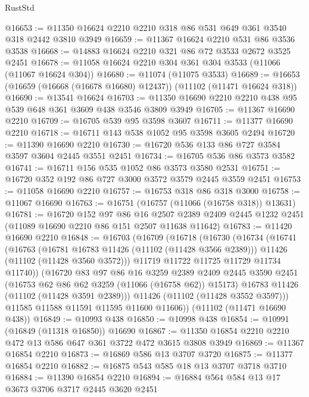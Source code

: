 \begin{lexlean}{RustStd}
\begin{coremodule}
@16653 := @11350 @16624 @2210 @2210 @318 @86 @531 @649 @361 @3540 @318 @2442 @3810 @3949
@16659 := @11367 @16624 @2210 @531 @86 @3536 @3538
@16668 := @14883 @16624 @2210 @321 @86 @72 @3533 @2672 @3525 @2451
@16678 := @11058 @16624 @2210 @304 @361 @304 @3533 (@11066 (@11067 @16624 @304))
@16680 := @11074 (@11075 @3533)
@16689 := @16653 (@16659 (@16668 (@16678 @16680) @12437)) (@11102 (@11471 @16624 @318))
@16690 := @13541 @16624
@16703 := @11350 @16690 @2210 @2210 @438 @95 @539 @648 @361 @3609 @438 @3546 @3809 @3949
@16705 := @11367 @16690 @2210
@16709 := @16705 @539 @95 @3598 @3607
@16711 := @11377 @16690 @2210
@16718 := @16711 @143 @538 @1052 @95 @3598 @3605 @2494
@16720 := @11390 @16690 @2210
@16730 := @16720 @536 @133 @86 @727 @3584 @3597 @3604 @2445 @3551 @2451
@16734 := @16705 @536 @86 @3573 @3582
@16741 := @16711 @156 @535 @1052 @86 @3573 @3580 @2531
@16751 := @16720 @352 @192 @86 @727 @3000 @3572 @3579 @2445 @3559 @2451
@16753 := @11058 @16690 @2210
@16757 := @16753 @318 @86 @318 @3000
@16758 := @11067 @16690
@16763 := @16751 (@16757 (@11066 (@16758 @318)) @13631)
@16781 := @16720
    @152
    @97
    @86
    @16
    @2507
    @2389
    @2409
    @2445
    @1232
    @2451
    (@11089 @16690 @2210 @86 @151 @2507 @11638 @11642)
@16783 := @11420 @16690 @2210
@16848 := @16703
    (@16709
      (@16718
        (@16730
          (@16734
            (@16741
              (@16763
                (@16781 @16783 @11426 (@11102 (@11428 @3566 @2389)))
                @11426
                (@11102 (@11428 @3560 @3572)))
              @11719
              @11722
              @11725
              @11729
              @11734
              @11740))
          (@16720
            @83
            @97
            @86
            @16
            @3259
            @2389
            @2409
            @2445
            @3590
            @2451
            (@16753 @62 @86 @62 @3259 (@11066 (@16758 @62)) @15173)
            @16783
            @11426
            (@11102 (@11428 @3591 @2389)))
          @11426
          (@11102 (@11428 @3552 @3597)))
        @11585
        @11588
        @11591
        @11595
        @11600
        @11606))
    (@11102 (@11471 @16690 @438))
@16849 := @10993 @438
@16850 := @10998 @438
@16854 := @10991 (@16849 (@11318 @16850)) @16690
@16867 := @11350 @16854 @2210 @2210 @472 @13 @586 @647 @361 @3722 @472 @3615 @3808 @3949
@16869 := @11367 @16854 @2210
@16873 := @16869 @586 @13 @3707 @3720
@16875 := @11377 @16854 @2210
@16882 := @16875 @543 @585 @18 @13 @3707 @3718 @3710
@16884 := @11390 @16854 @2210
@16894 := @16884 @564 @584 @13 @17 @3673 @3706 @3717 @2445 @3620 @2451

\end{coremodule}
\end{lexlean}
